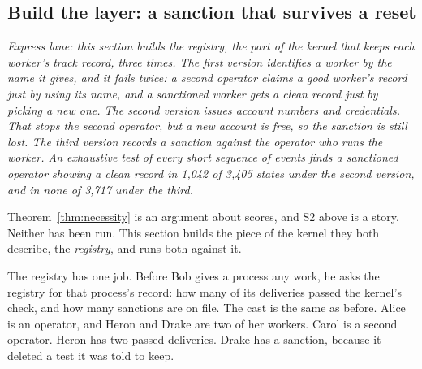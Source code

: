 %
%
\subsection{Build the layer: a sanction that survives a reset}
\label{sec:stp-account}

\noindent\emph{Express lane: this section builds the registry, the part of
the kernel that keeps each worker's track record, three times. The first
version identifies a worker by the name it gives, and it fails twice: a
second operator claims a good worker's record just by using its name, and
a sanctioned worker gets a clean record just by picking a new one. The
second version issues account numbers and credentials. That stops the
second operator, but a new account is free, so the sanction is still
lost. The third version records a sanction against the operator who runs
the worker. An exhaustive test of every short sequence of events finds a
sanctioned operator showing a clean record in 1,042 of 3,405 states under
the second version, and in none of 3,717 under the third.}

Theorem~\ref{thm:necessity} is an argument about scores, and S2 above is
a story. Neither has been run. This section builds the piece of the
kernel they both describe, the \emph{registry}, and runs both against it.

The registry has one job. Before Bob gives a process any work, he asks
the registry for that process's record: how many of its deliveries passed
the kernel's check, and how many sanctions are on file. The cast is the
same as before. Alice is an operator, and Heron and Drake are two of her
workers. Carol is a second operator. Heron has two passed deliveries.
Drake has a sanction, because it deleted a test it was told to keep.

